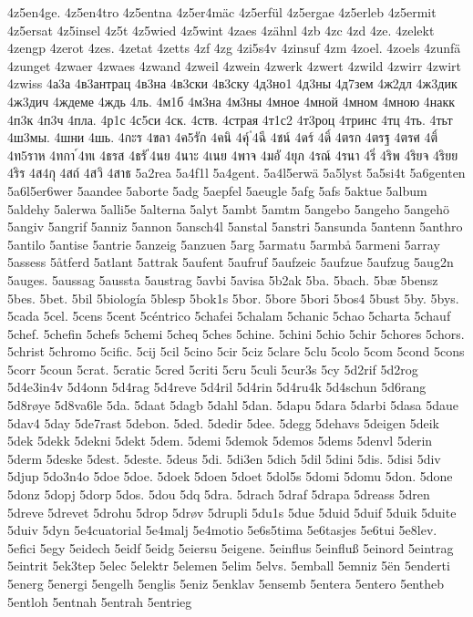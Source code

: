4z5en4ge.
4z5en4tro
4z5entna
4z5er4mäc
4z5erfül
4z5ergae
4z5erleb
4z5ermit
4z5ersat
4z5insel
4z5t
4z5wied
4z5wint
4zaes
4zähnl
4zb
4zc
4zd
4ze.
4zelekt
4zengp
4zerot
4zes.
4zetat
4zetts
4zf
4zg
4zi5s4v
4zinsuf
4zm
4zoel.
4zoels
4zunfä
4zunget
4zwaer
4zwaes
4zwand
4zweil
4zwein
4zwerk
4zwert
4zwild
4zwirr
4zwirt
4zwiss
4а3а
4в3антрац
4в3на
4в3ски
4в3ску
4д3но1
4д3ны
4д7зем
4ж2дл
4ж3дик
4ж3дич
4ждеме
4ждь
4ль.
4м1б
4м3на
4м3ны
4мное
4мной
4мном
4мною
4накк
4п3к
4п3ч
4пла.
4р1с
4с5си
4ск.
4ств.
4страя
4т1с2
4т3роц
4тринс
4тц
4ть.
4тьт
4ш3мы.
4шни
4шь.
4กะร
4ขลา
4ค5รัก
4คนิ
4คุ์
่4ฉี
4ชน์
4ดร์
4ดิ์
4ตรก
4ตรฐ
4ตรศ
4ติ์
4ท5ราห
4ทกา
์4ทเ
4ธรส
4ธรั
่4นย
4นาะ
4เนย
4พาจ
4มอั
4ยุภ
4รณ์
4รนา
4ริ่
4ริพ
4ริยจ
4ริยย
4ริร
4ส4กุ
4สถ์
4สวิ
4สาธ
5a2rea
5a4f1l
5a4gent.
5a4l5erwä
5a5lyst
5a5si4t
5a6genten
5a6l5er6wer
5aandee
5aborte
5adg
5aepfel
5aeugle
5afg
5afs
5aktue
5album
5aldehy
5alerwa
5alli5e
5alterna
5alyt
5ambt
5amtm
5angebo
5angeho
5angehö
5angiv
5angrif
5anniz
5annon
5ansch4l
5anstal
5anstri
5ansunda
5antenn
5anthro
5antilo
5antise
5antrie
5anzeig
5anzuen
5arg
5armatu
5armbå
5armeni
5array
5assess
5åtferd
5atlant
5attrak
5aufent
5aufruf
5aufzeic
5aufzue
5aufzug
5aug2n
5auges.
5aussag
5aussta
5austrag
5avbi
5avisa
5b2ak
5ba.
5bach.
5bæ
5bensz
5bes.
5bet.
5bil
5biología
5blesp
5bok1s
5bor.
5bore
5bori
5bos4
5bust
5by.
5bys.
5cada
5cel.
5cens
5cent
5céntrico
5chafei
5chalam
5chanic
5chao
5charta
5chauf
5chef.
5chefin
5chefs
5chemi
5cheq
5ches
5chine.
5chini
5chio
5chir
5chores
5chors.
5christ
5chromo
5cific.
5cij
5cil
5cino
5cir
5ciz
5clare
5clu
5colo
5com
5cond
5cons
5corr
5coun
5crat.
5cratic
5cred
5criti
5cru
5culi
5cur3s
5cy
5d2rif
5d2rog
5d4e3in4v
5d4onn
5d4rag
5d4reve
5d4ril
5d4rin
5d4ru4k
5d4schun
5d6rang
5d8røye
5d8va6le
5da.
5daat
5dagb
5dahl
5dan.
5dapu
5dara
5darbi
5dasa
5daue
5dav4
5day
5de7rast
5debon.
5ded.
5dedir
5dee.
5degg
5dehavs
5deigen
5deik
5dek
5dekk
5dekni
5dekt
5dem.
5demi
5demok
5demos
5dems
5denvl
5derin
5derm
5deske
5dest.
5deste.
5deus
5di.
5di3en
5dich
5dil
5dini
5dis.
5disi
5div
5djup
5do3n4o
5doe
5doe.
5doek
5doen
5doet
5dol5s
5domi
5domu
5don.
5done
5donz
5dopj
5dorp
5dos.
5dou
5dq
5dra.
5drach
5draf
5drapa
5dreass
5dren
5dreve
5drevet
5drohu
5drop
5drøv
5drupli
5du1s
5due
5duid
5duif
5duik
5duite
5duiv
5dyn
5e4cuatorial
5e4malj
5e4motio
5e6s5tima
5e6tasjes
5e6tui
5e8lev.
5efici
5egy
5eidech
5eidf
5eidg
5eiersu
5eigene.
5einflus
5einfluß
5einord
5eintrag
5eintrit
5ek3tep
5elec
5elektr
5elemen
5elim
5elvs.
5emball
5emniz
5ën
5enderti
5energ
5energi
5engelh
5englis
5eniz
5enklav
5ensemb
5entera
5entero
5entheb
5entloh
5entnah
5entrah
5entrieg
